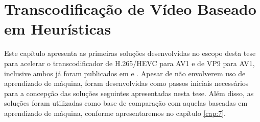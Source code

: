 \chapter{Transcodificação de Vídeo Baseado em Heurísticas}
\label{cap:6}

Este capítulo apresenta as primeiras soluções desenvolvidas no escopo desta tese para acelerar o transcodificador de H.265/HEVC para AV1 e de VP9 para AV1, inclusive ambos já foram publicados em \cite{bib:borges2_2021} e \cite{bib:borges_2021}. Apesar de não envolverem uso de aprendizado de máquina, foram desenvolvidas como passos iniciais necessários para a concepção das soluções seguintes apresentadas nesta tese. Além disso, as soluções foram utilizadas como base de comparação com aquelas baseadas em aprendizado de máquina, conforme apresentaremos no capítulo \ref{cap:7}.


